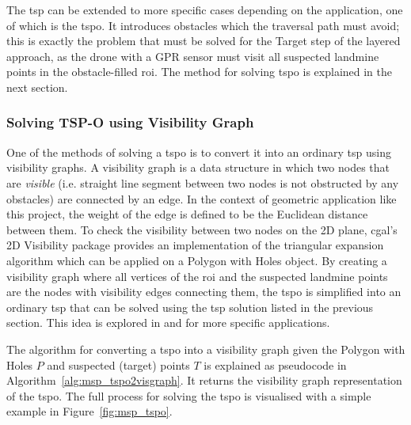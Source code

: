 The \gls{tsp} can be extended to more specific cases depending on the application, one of which is the \gls{tspo}. It introduces obstacles which the traversal path must avoid; this is exactly the problem that must be solved for the Target step of the layered approach, as the drone with a \gls{GPR} sensor must visit all suspected landmine points in the obstacle-filled \gls{roi}. The method for solving \gls{tspo} is explained in the next section. 

\subsubsection{Solving TSP-O using Visibility Graph}

One of the methods of solving a \gls{tspo} is to convert it into an ordinary \gls{tsp} using visibility graphs. A visibility graph is a data structure in which two nodes that are \textit{visible} (i.e. straight line segment between two nodes is not obstructed by any obstacles) are connected by an edge. In the context of geometric application like this project, the weight of the edge is defined to be the Euclidean distance between them. To check the visibility between two nodes on the 2D plane, \gls{cgal}'s 2D Visibility package \cite{cgal2024visibility} provides an implementation of the triangular expansion algorithm which can be applied on a Polygon with Holes object. By creating a visibility graph where all vertices of the \gls{roi} and the suspected landmine points are the nodes with visibility edges connecting them, the \gls{tspo} is simplified into an ordinary \gls{tsp} that can be solved using the \gls{tsp} solution listed in the previous section. This idea is explored in \cite{barb2024tspo} and \cite{bhat2024tspo} for more specific applications. 

The algorithm for converting a \gls{tspo} into a visibility graph given the Polygon with Holes $P$ and suspected (target) points $T$ is explained as pseudocode in Algorithm~\ref{alg:msp_tspo2visgraph}. It returns the visibility graph representation of the \gls{tspo}. The full process for solving the \gls{tspo} is visualised with a simple example in Figure~\ref{fig:msp_tspo}.

